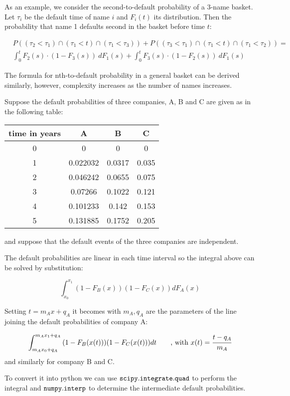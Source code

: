 \documentclass[11pt]{article}
\def\lt{<}
\begin{document}
As an example, we consider the second-to-default probability of a 3-name
basket. Let \(\tau_i\) be the default time of name \(i\) and \(F_i(t)\)
its distribution. Then the probability that name 1 defaults second in
the basket before time \(t\):

\[
\begin{align*}
&P((\tau_2\lt\tau_1)\cap (\tau_1\lt t)\cap (\tau_1\lt\tau_3)) +
P((\tau_3\lt\tau_1)\cap (\tau_1\lt t)\cap (\tau_1\lt\tau_2)) = \\
&\int_0^t{F_2 (s)\cdot (1-F_3 (s))~dF_1(s)} +  \int_0^t{F_3 (s)\cdot (1-F_2 (s))~dF_1(s)}
\end{align*}
\]

The formula for nth-to-default probability in a general basket can be
derived similarly, however, complexity increases as the number of names
increases.

Suppose the default probabilities of three companies, A, B and C are
given as in the following table:

\begin{longtable}[]{@{}cccc@{}}
\toprule
time in years & A & B & C\tabularnewline
\midrule
\endhead
0 & 0 & 0 & 0\tabularnewline
1 & 0.022032 & 0.0317 & 0.035\tabularnewline
2 & 0.046242 & 0.0655 & 0.075\tabularnewline
3 & 0.07266 & 0.1022 & 0.121\tabularnewline
4 & 0.101233 & 0.142 & 0.153\tabularnewline
5 & 0.131885 & 0.1752 & 0.205\tabularnewline
\bottomrule
\end{longtable}

and suppose that the default events of the three companies are
independent.

The default probabilities are linear in each time interval so the
integral above can be solved by substitution:

\[ \int_{x_0}^{x_1}{(1-F_B(x))(1-F_C(x))dF_A(x)}\]

Setting \(t=m_A x + q_A\) it becomes with \(m_A, q_A\) are the
parameters of the line joining the default probabilities of company A:

\[ \int_{m_A x_0 + q_A}^{m_A x_1 + q_A}{(1-F_B(x(t)))(1-F_C(x(t)))dt}\qquad\textrm{, with}~x(t) = \cfrac{t -q_A}{m_A} \]
and similarly for company B and C.

To convert it into python we can use \(\tt{scipy.integrate.quad}\) to
perform the integral and \(\tt{numpy.interp}\) to determine the
intermediate default probabilities.
\end{document}
